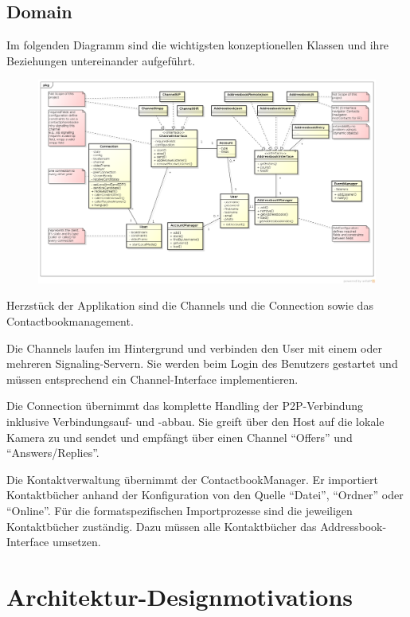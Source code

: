 \begin{landscape}
\section{Domain}
	Im folgenden Diagramm sind die wichtigsten konzeptionellen Klassen und ihre Beziehungen untereinander aufgeführt.
	\begin{figure}[H]
		\centering
		\includegraphics[width=1.2\textwidth]{../architekturanalayse/img/domain.png}
	\end{figure}
	Herzstück der Applikation sind die Channels und die Connection sowie das Contactbookmanagement.
	
	Die Channels laufen im Hintergrund und verbinden den User mit einem oder mehreren Signaling-Servern. Sie werden beim Login des Benutzers gestartet und müssen entsprechend ein Channel-Interface implementieren.
	
	Die Connection übernimmt das komplette Handling der P2P-Verbindung inklusive Verbindungsauf- und -abbau. Sie greift über den Host auf die lokale Kamera zu und sendet und empfängt über einen Channel "`Offers"' und "`Answers/Replies"'.
	
	Die Kontaktverwaltung übernimmt der ContactbookManager. Er importiert Kontaktbücher anhand der Konfiguration von den Quelle "`Datei"', "`Ordner"' oder "`Online"'. Für die formatspezifischen Importprozesse sind die jeweiligen Kontaktbücher zuständig. Dazu müssen alle Kontaktbücher das Addressbook-Interface umsetzen.
\end{landscape}
\clearpage

\section{Architektur-Designmotivations}
